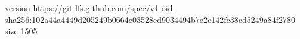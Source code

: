 version https://git-lfs.github.com/spec/v1
oid sha256:102a44a4449d205249b0664e03528ed9034494b7e2c142fc38cd5249a84f2780
size 1505
